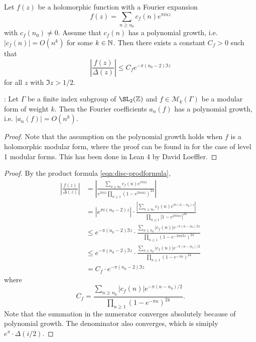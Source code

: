 \begin{lemma}\label{lemma:mod-div-disc-bound}\leanok
Let $f(z)$ be a holomorphic function with a Fourier expansion
\begin{equation}
    f(z) = \sum_{n \ge n_0} c_f(n) e^{\pi i n z}
\end{equation}
with $c_f(n_0) \ne 0$.
Assume that $c_f(n)$ has a polynomial growth, i.e. $|c_f(n)| = O(n^k)$ for some $k \in \mathbb{N}$.
Then there exists a constant $C_f > 0$ such that
\begin{equation}
    \left|\frac{f(z)}{\Delta(z)}\right| \le C_f e^{-\pi (n_0 - 2) \Im z}
\end{equation}
for all $z$ with $\Im z > 1/2$.
\end{lemma}

\begin{lemma}\label{lemma:mod_form_poly_growth} : Let $\Gamma$ be a finite index subgroup of $\SL_2(\Z)$ and $f \in \mathcal{M}_k(\Gamma)$ be a modular form of weight $k$. Then the Fourier coefficients $a_n(f)$ has a polynomial growth, i.e. $|a_n(f)| = O(n^k)$.
\end{lemma}

\begin{proof}\leanok
Note that the assumption on the polynomial growth holds when $f$ is a holomorphic modular form, where the proof can be found in \cite[p. 94]{Serre73} for the case of level 1 modular forms. This has been done in Lean 4 by David Loeffler.
\end{proof}

\begin{proof}\leanok
By the product formula \eqref{eqn:disc-prodformula},
\begin{align}
    \left|\frac{f(z)}{\Delta(z)}\right| &= \left|\frac{\sum_{n \ge n_0} c_f(n) e^{\pi i n z}}{e^{2 \pi i z}\prod_{n \ge 1} (1 - e^{2\pi i n z})^{24}}\right| \\
    &= |e^{\pi i (n_0 - 2)z}| \cdot \frac{|\sum_{n \ge n_0} c_f(n) e^{\pi i (n - n_0) z}|}{\prod_{n \ge 1} |1 - e^{2\pi i n z}|^{24}} \\
    &\le e^{-\pi (n_0 - 2) \Im z} \cdot \frac{\sum_{n \ge n_0} |c_f(n)| e^{-\pi (n - n_0) \Im z}}{\prod_{n \ge 1} (1 - e^{- 2\pi n \Im z})^{24}} \\
    &\le e^{-\pi (n_0 - 2) \Im z} \cdot \frac{\sum_{n \ge n_0} |c_f(n)| e^{-\pi (n - n_0) / 2}}{\prod_{n \ge 1} (1 - e^{-\pi n})^{24}} \\
    &= C_f \cdot e^{-\pi (n_0 - 2) \Im z}
\end{align}
where
\begin{equation}
    C_f = \frac{\sum_{n \ge n_0} |c_f(n)| e^{-\pi (n - n_0) / 2}}{\prod_{n \ge 1} (1 - e^{-\pi n})^{24}}.
\end{equation}
Note that the summation in the numerator converges absolutely because of polynomial growth.
The denominator also converges, which is simiply $e^{\pi} \cdot \Delta(i/2)$.
\end{proof}

